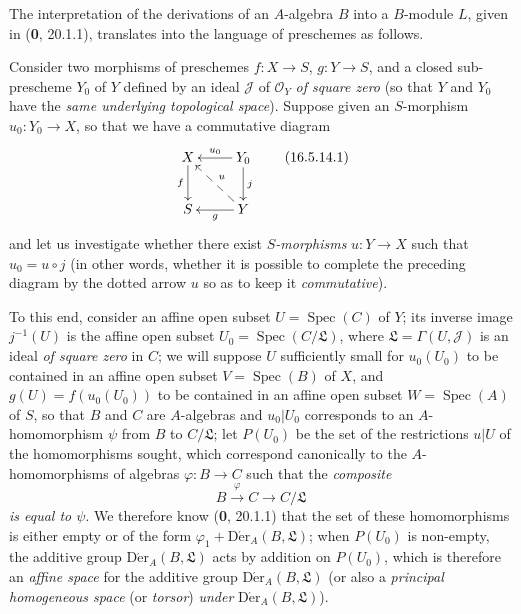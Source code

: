 \begin{env}[16.5.14]
\label{IV.16.5.14}
The interpretation of the derivations of an $A$-algebra $B$ into a $B$-module
$L$, given in (\textbf{0}, 20.1.1), translates into the language of preschemes as
follows.

Consider two morphisms of preschemes $f:X\to S$, $g:Y\to S$, and a
closed sub-prescheme $Y_0$ of $Y$ defined by an ideal $\mathscr{J}$ of
$\mathcal{O}_Y$ \emph{of square zero} (so that $Y$ and $Y_0$ have the
\emph{same underlying topological space}). Suppose given an $S$-morphism
$u_0:Y_0\to X$, so that we have a commutative diagram
\[
  \xymatrix{
    X\ar[d]_-f & Y_0\ar[l]_-{u_0}\ar[d]^j\\
    S & Y\ar@{-->}[ul]_-u\ar[l]^-g
  }
  \tag{16.5.14.1}
  \label{IV.16.5.14.1}
\]
and let us investigate whether there exist \emph{$S$-morphisms}
$u:Y\to X$ such that $u_0=u\circ j$ (in other words, whether it is possible to
complete the preceding diagram by the dotted arrow $u$ so as to
keep it \emph{commutative}).

To this end, consider an affine open subset $U=\operatorname{Spec}(C)$ of $Y$;
its inverse image $j^{-1}(U)$ is the affine open subset
$U_0=\operatorname{Spec}(C/\mathfrak{L})$, where
$\mathfrak{L}=\Gamma(U,\mathscr{J})$ is an ideal \emph{of square zero} in $C$;
we will suppose $U$ sufficiently small for $u_0(U_0)$ to be contained in an
affine open subset $V=\operatorname{Spec}(B)$ of $X$, and
$g(U)=f(u_0(U_0))$ to be contained in an affine open subset
$W=\operatorname{Spec}(A)$ of $S$, so that $B$ and $C$ are
$A$-algebras and $u_0|U_0$ corresponds to an $A$-homomorphism $\psi$ from
$B$ to $C/\mathfrak{L}$; let $P(U_0)$ be the set of the restrictions $u|U$
of the homomorphisms sought, which correspond canonically to the
$A$-homomorphisms of algebras $\varphi:B\to C$ such that the \emph{composite}
\[
  B\xrightarrow{\varphi}C\longrightarrow C/\mathfrak{L}
\]
\emph{is equal to $\psi$}. We therefore know (\textbf{0}, 20.1.1) that the set of these
homomorphisms is either empty or of the form
$\varphi_1+\operatorname{D\acute{e}r}_A(B,\mathfrak{L})$; when $P(U_0)$ is
non-empty, the additive group $\operatorname{D\acute{e}r}_A(B,\mathfrak{L})$ acts by
addition on $P(U_0)$, which is therefore an \emph{affine space} for the
additive group $\operatorname{D\acute{e}r}_A(B,\mathfrak{L})$ (or also a
\emph{principal homogeneous space} (or \emph{torsor}) \emph{under}
$\operatorname{D\acute{e}r}_A(B,\mathfrak{L})$).


\end{env}
